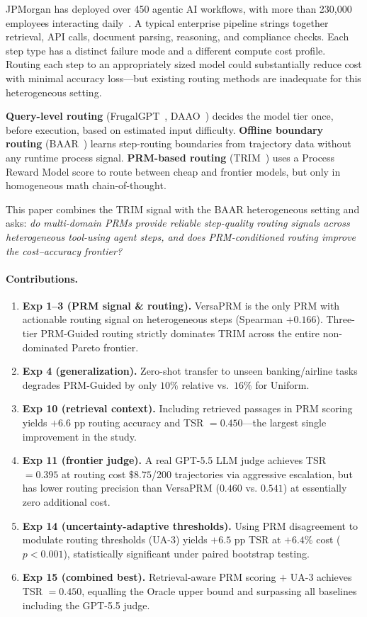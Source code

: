 \documentclass[sigconf,natbib=false]{acmart}
\begin{document}
JPMorgan has deployed over 450 agentic AI workflows, with more than 230,000
employees interacting daily~\cite{jpmorgan2026}.  A typical enterprise pipeline
strings together retrieval, API calls, document parsing, reasoning, and
compliance checks.  Each step type has a distinct failure mode and a different
compute cost profile.  Routing each step to an appropriately sized model could
substantially reduce cost with minimal accuracy loss---but existing routing
methods are inadequate for this heterogeneous setting.

\textbf{Query-level routing} (FrugalGPT~\cite{frugalgpt2023},
DAAO~\cite{daao2025}) decides the model tier once, before execution, based on
estimated input difficulty.  \textbf{Offline boundary routing}
(BAAR~\cite{baar2026}) learns step-routing boundaries from trajectory data
without any runtime process signal.  \textbf{PRM-based routing} (TRIM~\cite{trim2026})
uses a Process Reward Model score to route between cheap and frontier models,
but only in homogeneous math chain-of-thought.

This paper combines the TRIM signal with the BAAR heterogeneous setting and
asks: \emph{do multi-domain PRMs provide reliable step-quality routing signals
across heterogeneous tool-using agent steps, and does PRM-conditioned routing
improve the cost--accuracy frontier?}

\paragraph{Contributions.}
\begin{enumerate}[leftmargin=*,topsep=2pt,itemsep=2pt]
  \item \textbf{Exp 1--3 (PRM signal \& routing).} VersaPRM is the only PRM
    with actionable routing signal on heterogeneous steps (Spearman $+0.166$).
    Three-tier PRM-Guided routing strictly dominates TRIM across the entire
    non-dominated Pareto frontier.
  \item \textbf{Exp 4 (generalization).} Zero-shot transfer to unseen
    banking/airline tasks degrades PRM-Guided by only $10\%$ relative
    vs.\ $16\%$ for Uniform.
  \item \textbf{Exp 10 (retrieval context).} Including retrieved passages in
    PRM scoring yields $+6.6$ pp routing accuracy and TSR $= 0.450$---the
    largest single improvement in the study.
  \item \textbf{Exp 11 (frontier judge).} A real GPT-5.5 LLM judge achieves
    TSR $= 0.395$ at routing cost $\$8.75$/200 trajectories via aggressive
    escalation, but has lower routing precision than VersaPRM ($0.460$ vs.
    $0.541$) at essentially zero additional cost.
  \item \textbf{Exp 14 (uncertainty-adaptive thresholds).} Using PRM
    disagreement to modulate routing thresholds (UA-3) yields $+6.5$ pp TSR
    at $+6.4\%$ cost ($p < 0.001$), statistically significant under paired
    bootstrap testing.
  \item \textbf{Exp 15 (combined best).} Retrieval-aware PRM scoring $+$ UA-3
    achieves TSR $= 0.450$, equalling the Oracle upper bound and surpassing all
    baselines including the GPT-5.5 judge.
\end{enumerate}
\end{document}
